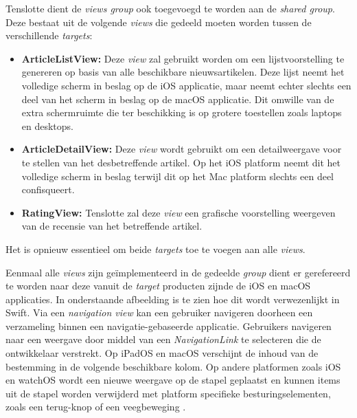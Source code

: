 Tenslotte dient de \textit{views group} ook toegevoegd te worden aan de \textit{shared group}. Deze bestaat uit de volgende \textit{views} die gedeeld moeten worden tussen de verschillende \textit{targets}:

\begin{itemize}
    \item \textbf{ArticleListView:} Deze \textit{view} zal gebruikt worden om een lijstvoorstelling te genereren op basis van alle beschikbare nieuwsartikelen. Deze lijst neemt het volledige scherm in beslag op de iOS applicatie, maar neemt echter slechts een deel van het scherm in beslag op de macOS applicatie. Dit omwille van de extra schermruimte die ter beschikking is op grotere toestellen zoals laptops en desktops.
    \item \textbf{ArticleDetailView:} Deze \textit{view} wordt gebruikt om een detailweergave voor te stellen van het desbetreffende artikel. Op het iOS platform neemt dit het volledige scherm in beslag terwijl dit op het Mac platform slechts een deel confisqueert. 
    \item \textbf{RatingView:} Tenslotte zal deze \textit{view} een grafische voorstelling weergeven van de recensie van het betreffende artikel. 
\end{itemize}

Het is opnieuw essentieel om beide \textit{targets} toe te voegen aan alle \textit{views}.

\pagebreak
Eenmaal alle \textit{views} zijn geïmplementeerd in de gedeelde \textit{group} dient er gerefereerd te worden naar deze vanuit de \textit{target} producten zijnde de iOS en macOS applicaties. In onderstaande afbeelding is te zien hoe dit wordt verwezenlijkt in Swift. Via een \textit{navigation view} kan een gebruiker navigeren doorheen een verzameling binnen een navigatie-gebaseerde applicatie. Gebruikers navigeren naar een weergave door middel van een \textit{NavigationLink} te selecteren die de ontwikkelaar verstrekt. Op iPadOS en macOS verschijnt de inhoud van de bestemming in de volgende beschikbare kolom. Op andere platformen zoals iOS en watchOS wordt een nieuwe weergave op de stapel geplaatst en kunnen items uit de stapel worden verwijderd met platform specifieke besturingselementen, zoals een terug-knop of een veegbeweging \autocite{AppleDeveloper2022c}.

